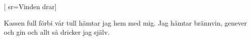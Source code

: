 [				
	sr={Vinden drar}]		
	
\beginverse*						
Kassen full
förbi vår tull
hämtar jag hem med mig.
Jag hämtar brännvin, genever och gin
och allt så dricker jag själv. 
\endverse				
\endsong		
